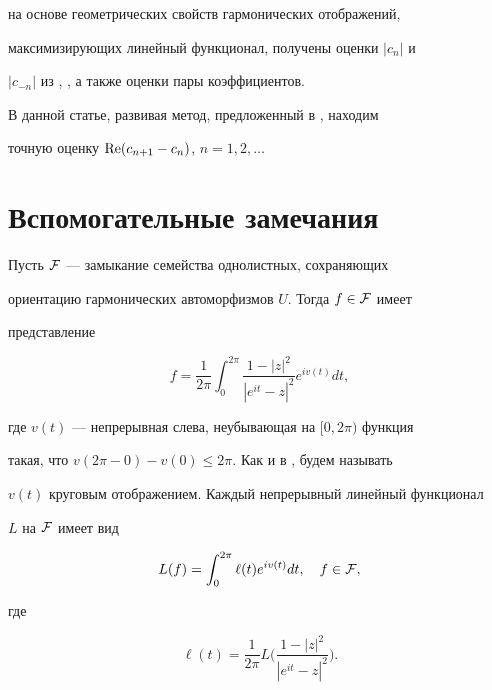 \cite{3} на основе геометрических свойств гармонических отображений, 


максимизирующих линейный функционал, получены оценки $|c_n|$ и 


$|c_{-n}|$ из \cite{1}, \cite{2}, а также оценки пары коэффициентов. 


 


В данной статье, развивая метод, предложенный в \cite{1}, находим 


точную оценку $\operatorname{Re}(c_{n+1}-c_n)$, $n=1,2,\dotsc$ 


 


\section{Вспомогательные замечания} 


 


Пусть $\cal F$ --- замыкание семейства однолистных, сохраняющих 


ориентацию гармонических автоморфизмов $U$. Тогда $f\in\cal F$ имеет 


представление 


$$ 


f=\frac{1}{2\pi}\int^{2\pi}_0\frac{1-|z|^2}{|e^{it}-z|^2} 


e^{iv(t)}dt, 


$$ 


где $v(t)$ --- непрерывная слева, неубывающая на $[0,2\pi)$ функция 


такая, что $v(2\pi-0)-v(0)\le2\pi$. Как и в \cite{1}, будем называть 


$v(t)$ круговым отображением. Каждый непрерывный линейный функционал 


$L$ на $\cal F$ имеет вид 


\begin{equation} 


L(f)=\int^{2\pi}_0 \ell(t)e^{iv(t)}dt,\quad f\in\cal F, 


\end{equation} 


где 


\begin{equation} 


\ell(t)=\frac{1}{2\pi}L\bigg( 


\frac{1-|z|^2}{|e^{it}-z|^2}\bigg). 


\end{equation} 


